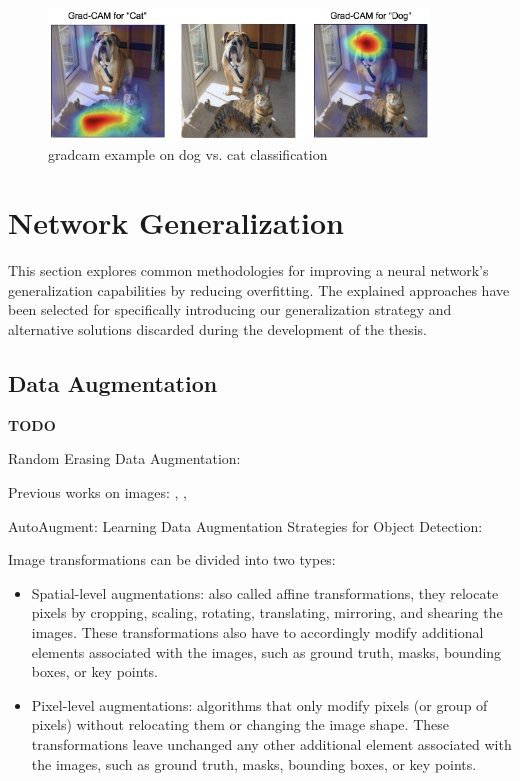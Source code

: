 \begin{figure}[!htb]
\centering
\includegraphics[width=0.9\textwidth]{"contents/images/gradcam/02-gradcam-catdog"}
\caption[\gls{gradcam} example on dog vs. cat classification]{\gls{gradcam} example on dog vs. cat classification \cite{Selvaraju_2019}}
\label{fig:gradcam-catdog}
\end{figure}




\section{Network Generalization}
\label{sec:network-generalization}

This section explores common methodologies for improving a neural network's generalization capabilities by reducing overfitting. The explained approaches have been selected for specifically introducing our generalization strategy and alternative solutions discarded during the development of the thesis.



\subsection{Data Augmentation}
\label{subsec:data-augmentation}

\textbf{TODO}

Random Erasing Data Augmentation: \cite{zhong2017random}

Previous works on images:  \cite{yue2019domain}, \cite{Takahashi_2020}, \cite{xie2020unsupervised}

AutoAugment: \cite{cubuk2019autoaugment}
Learning Data Augmentation Strategies for Object Detection: \cite{zoph2019learning}

\medskip

Image transformations can be divided into two types:
\begin{itemize}
	\item Spatial-level augmentations: also called affine transformations, they relocate pixels by cropping, scaling, rotating, translating, mirroring, and shearing the images. These transformations also have to accordingly modify additional elements associated with the images, such as ground truth, masks, bounding boxes, or key points.
	\item Pixel-level augmentations: algorithms that only modify pixels (or group of pixels) without relocating them or changing the image shape. These transformations leave unchanged any other additional element associated with the images, such as ground truth, masks, bounding boxes, or key points.
\end{itemize}



